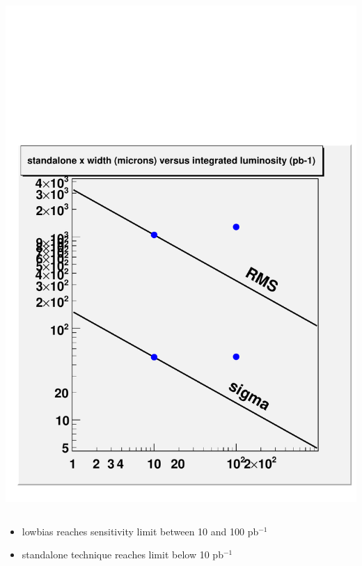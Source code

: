 \documentclass[compress]{beamer}
\begin{document}
\begin{frame}
\begin{columns}
\begin{center}
\includegraphics[width=\linewidth]{realplots/standalone_width_vsevents}
\end{center}
\end{columns}
\begin{itemize}
\item lowbias reaches sensitivity limit between 10 and 100 pb$^{-1}$
\item standalone technique reaches limit below 10 pb$^{-1}$
\end{itemize}
\end{frame}
\end{document}
